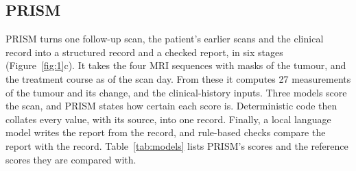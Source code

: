 \subsection{PRISM}\label{sec:2.2}

PRISM turns one follow-up scan, the patient's earlier scans and the clinical record into a structured record and a
checked report, in six stages (Figure~\ref{fig:1}c). It takes the four MRI sequences with masks of the tumour, and the
treatment course as of the scan day. From these it computes 27 measurements of the tumour and its change, and the
clinical-history inputs. Three models score the scan, and PRISM states how certain each score is. Deterministic code
then collates every value, with its source, into one record. Finally, a local language model writes the report from
the record, and rule-based checks compare the report with the record. Table~\ref{tab:models} lists PRISM's scores and
the reference scores they are compared with.

